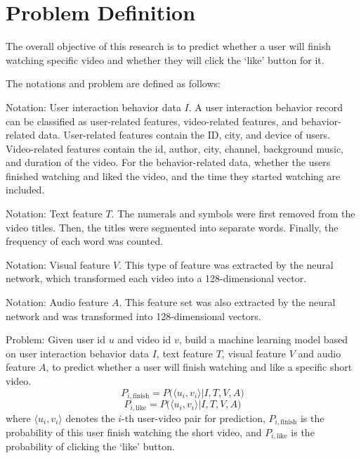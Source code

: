 \documentclass{article}
\begin{document}

\section{Problem Definition}
\label{sec:problem-definition}

The overall objective of this research is to predict whether a user will finish watching specific video and whether they will click the `like' button for it.

The notations and problem are defined as follows:

Notation: User interaction behavior data $I$. A user interaction behavior record can be classified as user-related features, video-related features, and behavior-related data. User-related features contain the ID, city, and device of users. Video-related features contain the id, author, city, channel, background music, and duration of the video. For the behavior-related data, whether the users finished watching and liked the video, and the time they started watching are included.

Notation: Text feature $T$. The numerals and symbols were first removed from the video titles. Then, the titles were segmented into separate words. Finally, the frequency of each word was counted.

Notation: Visual feature $V$. This type of feature was extracted by the neural network, which transformed each video into a 128-dimensional vector.

Notation: Audio feature $A$. This feature set was also extracted by the neural network and was transformed into 128-dimensional vectors.

Problem: Given user id $u$ and video id $v$, build a machine learning model based on user interaction behavior data $I$, text feature $T$, visual feature $V$ and audio feature $A$, to predict whether a user will finish watching and like a specific short video.
%
\begin{equation}
  P_{i,\text{finish}} = P\big( \langle u_i, v_i \rangle | I,T,V,A \big)
\end{equation}
%
\begin{equation}
  P_{i,\text{like}} = P\big( \langle u_i, v_i \rangle | I,T,V,A \big)
\end{equation}
%
where $\langle u_i, v_i \rangle$ denotes the $i$-th user-video pair for
prediction, $P_{i,\text{finish}}$ is the probability of this user
finish watching the short video, and $P_{i,\text{like}}$ is the
probability of clicking the `like' button.
\end{document}
